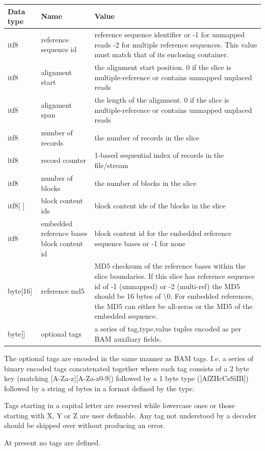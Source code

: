 \documentclass[a4paper]{article}
\begin{document}
\begin{tabular}{|l|l|>{\raggedright}p{200pt}|}
\hline
\textbf{Data type} & \textbf{Name} & \textbf{Value}\tabularnewline
\hline
itf8 & reference sequence id & reference sequence identifier or\linebreak{}
-1 for unmapped reads\linebreak{}
-2 for multiple reference sequences.\linebreak{}
This value must match that of its enclosing container.\tabularnewline
\hline
itf8 & alignment start & the alignment start position.\linebreak{}
0 if the slice is multiple-reference
or contains unmapped unplaced reads\tabularnewline
\hline
itf8 & alignment span & the length of the alignment.\linebreak{}
0 if the slice is multiple-reference
or contains unmapped unplaced reads\tabularnewline
\hline
itf8 & number of records & the number of records in the slice\tabularnewline
\hline
ltf8 & record counter & 1-based sequential index of records in the file/stream\tabularnewline
\hline
itf8 & number of blocks & the number of blocks in the slice\tabularnewline
\hline
itf8[ ] & block content ids & block content ids of the blocks in the slice\tabularnewline
\hline
itf8 & embedded reference bases block content id & block content id for the embedded 
reference sequence bases or -1 for none\tabularnewline
\hline
byte[16] & reference md5 & MD5 checksum of the reference bases within the slice 
boundaries.  If this slice has reference sequence id of -1 (unmapped) or -2 (multi-ref)
the MD5 should be 16 bytes of \textbackslash{}0. For embedded references, the MD5
can either be all-zeros or the MD5 of the embedded sequence.\tabularnewline
\hline
byte[] & optional tags & a series of tag,type,value tuples encoded as
per BAM auxiliary fields.\tabularnewline
\hline
\end{tabular}

The optional tags are encoded in the same manner as BAM tags.  I.e. a
series of binary encoded tags concatenated together where each tag
consists of a 2 byte key (matching [A-Za-z][A-Za-z0-9]) followed by a
1 byte type ([AfZHcCsSiIB]) followed by a string of bytes in a format
defined by the type.

Tags starting in a capital letter are reserved while lowercase ones or
those starting with X, Y or Z are user definable.  Any tag not
understood by a decoder should be skipped over without producing an
error.

At present no tags are defined.
\end{document}

